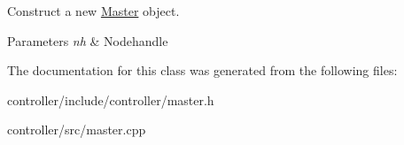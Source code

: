 Construct a new \hyperlink{classMaster}{Master} object. 


\begin{DoxyParams}{Parameters}
{\em nh} & Nodehandle \\
\hline
\end{DoxyParams}


The documentation for this class was generated from the following files\+:\begin{DoxyCompactItemize}
\item 
controller/include/controller/master.\+h\item 
controller/src/master.\+cpp\end{DoxyCompactItemize}
